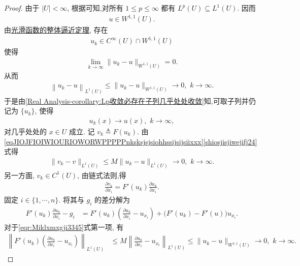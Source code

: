\documentclass[../../main.tex]{subfiles}
\begin{document}
\begin{proof}
由于 $|U|<\infty$, 根据可知,对所有 $1\leqslant p\leqslant\infty$ 都有 $L^{p}(U)\subseteq L^{1}(U)$. 因而
\begin{align*}
u\in W^{1,1}(U).
\end{align*}
由\hyperref[theorem:ch05-光滑函数的整体逼近定理]{光滑函数的整体逼近定理}, 存在
\begin{align*}
u_k\in C^{\infty}(U)\cap W^{1,1}(U)
\end{align*}
使得
\begin{align*}
\lim\limits_{k\to\infty}\|u_k-u\|_{W^{1,1}(U)}=0.
\end{align*}
从而
\begin{align}\label{shiosjisjiwejifj24}
\left\| u_k-u \right\| _{L^1\left( U \right)}\leqslant \parallel u_k-u\parallel _{W^{1,1}\left( U \right)}\rightarrow 0,\,\,k\to \infty.
\end{align}
于是由\cref{Real Analysis-corollary:Lp收敛必存在子列几乎处处收敛}知,可取子列并仍记为 $\{u_k\}$, 使得
\begin{align}\label{HJKHuiwfjnsmzzzz}
u_k(x)\longrightarrow u(x),\,\,k\to \infty,
\end{align}
对几乎处处的 $x\in U$ 成立.
记 $v_k\triangleq F(u_k)$. 由\eqref{eqJIOJFIOIWIOURIOWORWPPPPPnksksjsjsiohhssijsijsiixxx}\eqref{shiosjisjiwejifj24}式得
\begin{align}\label{HJNJZNNJJAHJNZMZ}
\|v_k-v\|_{L^{1}(U)}
\leqslant M\|u_k-u\|_{L^{1}(U)}
\longrightarrow 0,\,\,k\to \infty.
\end{align}
另一方面, $v_k\in C^{1}(U)$, 由链式法则,得
\begin{align*}
\frac{\partial v_k}{\partial x_i}
=F'(u_k)\frac{\partial u_k}{\partial x_i}.
\end{align*}
固定 $i\in\{1,\cdots,n\}$. 将其与 $g_i$ 的差分解为
\begin{align}\label{eqr:Miklxmxgji3345}
F'(u_k)\frac{\partial u_k}{\partial x_i}-g_i
&=F'(u_k)\left(\frac{\partial u_k}{\partial x_i}-u_{x_i}\right)
+\bigl(F'(u_k)-F'(u)\bigr)u_{x_i}.
\end{align}
对于\eqref{eqr:Miklxmxgji3345}式第一项, 有
\begin{align}\label{HJIIOIAIWngkls3242342124}
\left\|F'(u_k)\left(\frac{\partial u_k}{\partial x_i}-u_{x_i}\right)\right\|_{L^{1}(U)}
&\leqslant M\left\|\frac{\partial u_k}{\partial x_i}-u_{x_i}\right\|_{L^{1}(U)}
\leqslant \parallel u_k-u\parallel _{W^{1,1}\left( U \right)}\rightarrow 0,\,\,k\to \infty.
\end{align}

\end{proof}
\end{document}
